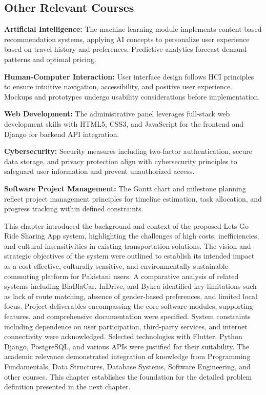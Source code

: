 \subsection{Other Relevant Courses}

\textbf{Artificial Intelligence:} The machine learning module implements content-based recommendation systems, applying AI concepts to personalize user experience based on travel history and preferences. Predictive analytics forecast demand patterns and optimal pricing.

\textbf{Human-Computer Interaction:} User interface design follows HCI principles to ensure intuitive navigation, accessibility, and positive user experience. Mockups and prototypes undergo usability considerations before implementation.

\textbf{Web Development:} The administrative panel leverages full-stack web development skills with HTML5, CSS3, and JavaScript for the frontend and Django for backend API integration.

\textbf{Cybersecurity:} Security measures including two-factor authentication, secure data storage, and privacy protection align with cybersecurity principles to safeguard user information and prevent unauthorized access.

\textbf{Software Project Management:} The Gantt chart and milestone planning reflect project management principles for timeline estimation, task allocation, and progress tracking within defined constraints.

This chapter introduced the background and context of the proposed Lets Go Ride Sharing App system, highlighting the challenges of high costs, inefficiencies, and cultural insensitivities in existing transportation solutions. The vision and strategic objectives of the system were outlined to establish its intended impact as a cost-effective, culturally sensitive, and environmentally sustainable commuting platform for Pakistani users. A comparative analysis of related systems including BlaBlaCar, InDrive, and Bykea identified key limitations such as lack of route matching, absence of gender-based preferences, and limited local focus. Project deliverables encompassing the core software modules, supporting features, and comprehensive documentation were specified. System constraints including dependence on user participation, third-party services, and internet connectivity were acknowledged. Selected technologies with Flutter, Python Django, PostgreSQL, and various APIs were justified for their suitability. The academic relevance demonstrated integration of knowledge from Programming Fundamentals, Data Structures, Database Systems, Software Engineering, and other courses. This chapter establishes the foundation for the detailed problem definition presented in the next chapter.
